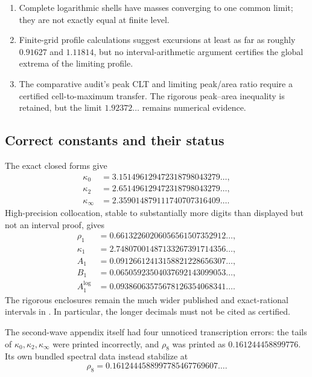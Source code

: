\documentclass[11pt,oneside]{article}
\numberwithin{equation}{section}
\theoremstyle{definition}
\theoremstyle{remark}
\begin{document}
\begin{enumerate}
      of an atomless singular measure.  Division by the mantissa contributes an ordinary
      absolutely continuous factor, so the profile itself is not a singular distribution
      function or a measure.
\item Complete logarithmic shells have masses converging to one common limit; they are not
      exactly equal at finite level.
\item Finite-grid profile calculations suggest excursions at least as far as roughly
      $0.91627$ and $1.11814$, but no interval-arithmetic argument certifies the global
      extrema of the limiting profile.
\item The comparative audit's peak CLT and limiting peak/area ratio require a certified
      cell-to-maximum transfer.  The rigorous peak--area inequality is retained, but the
      limit $1.92372\ldots$ remains numerical evidence.
\end{enumerate}

\subsection{Correct constants and their status}

The exact closed forms give
\[
 \begin{aligned}
 \kappa_0&=3.151496129472318798043279\ldots,\\
 \kappa_2&=2.651496129472318798043279\ldots,\\
 \kappa_\infty&=2.359014879111740707316409\ldots.
 \end{aligned}
\]
High-precision collocation, stable to substantially more digits than displayed but not an
interval proof, gives
\[
 \begin{aligned}
 \rho_1&=0.66132260206056561507352912\ldots,\\
 \kappa_1&=2.74807001487133267391714356\ldots,\\
 A_1&=0.09126612413158821228656307\ldots,\\
 B_1&=0.06505923504037692143099053\ldots,\\
 A_1^{\log}&=0.09386063575678126354068341\ldots.
 \end{aligned}
\]
The rigorous enclosures remain the much wider published and exact-rational intervals in
.  In particular, the longer decimals must not be cited as
certified.

The second-wave appendix itself had four unnoticed transcription errors: the tails of
$\kappa_0,\kappa_2,\kappa_\infty$ were printed incorrectly, and
$\rho_8$ was printed as $0.161244458899776$.  Its own bundled spectral data instead stabilize
at
\[
 \rho_8=0.1612444588997785467769607\ldots.
\]
\end{document}
